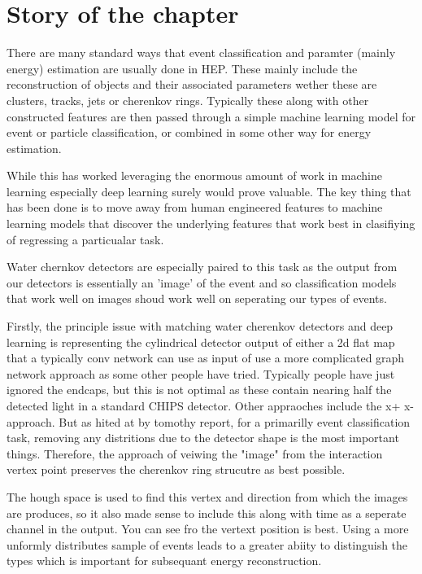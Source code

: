 \section{Story of the chapter}

There are many standard ways that event classification and paramter (mainly energy) estimation are
usually done in HEP. These mainly include the reconstruction of objects and their associated parameters
wether these are clusters, tracks, jets or cherenkov rings. Typically these along with other constructed
features are then passed through a simple machine learning model for event or particle classification, or
combined in some other way for energy estimation.

While this has worked leveraging the enormous amount of work in machine learning especially deep learning
surely would prove valuable. The key thing that has been done is to move away from human engineered features
to machine learning models that discover the underlying features that work best in clasifiying of regressing
a particualar task.

Water chernkov detectors are especially paired to this task as the output from our detectors is essentially
an 'image' of the event and so classification models that work well on images shoud work well on
seperating our types of events.

Firstly, the principle issue with matching water cherenkov detectors and deep learning is representing the cylindrical
detector output of either a 2d flat map that a typically conv network can use as input of use a more complicated
graph network approach as some other people have tried. Typically people have just ignored the endcaps, but
this is not optimal as these contain nearing half the detected light in a standard CHIPS detector. Other appraoches
include the x+ x- approach. But as hited at by tomothy report, for a primarilly event classification task,
removing any distritions due to the detector shape is the most important things. Therefore, the approach of
veiwing the "image" from the interaction vertex point preserves the cherenkov ring strucutre as best possible.

The hough space is used to find this vertex and direction from which the images are produces, so it also made sense
to include this along with time as a seperate channel in the output. You can see fro the vertext position is best. Using
a more unformly distributes sample of events leads to a greater abiity to distinguish the types which is important
for subsequant energy reconstruction.

